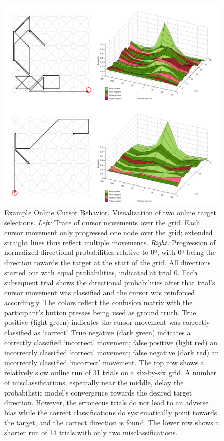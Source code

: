 \begin{figure}[p]
    \renewcommand\thefigure{\ref{chapter:nat}.S9}
    \centering
    \includegraphics[width=\textwidth]{figures/nat-app-fig-s9.png}
    \caption[Example online cursor behavior.]{Example Online Cursor Behavior. Visualization of two online target selections. \textit{Left:} Trace of cursor movements over the grid. Each cursor movement only progressed one node over the grid; extended straight lines thus reflect multiple movements. \textit{Right:} Progression of normalized directional probabilities relative to 0º, with 0º being the direction towards the target at the start of the grid. All directions started out with equal probabilities, indicated at trial 0. Each subsequent trial shows the directional probabilities after that trial's cursor movement was classified and the cursor was reinforced accordingly. The colors reflect the confusion matrix with the participant's button presses being used as ground truth. True positive (light green) indicates the cursor movement was correctly classified as `correct'. True negative (dark green) indicates a correctly classified `incorrect' movement; false positive (light red) an incorrectly classified `correct' movement; false negative (dark red) an incorrectly classified `incorrect' movement. The top row shows a relatively slow online run of 31 trials on a six-by-six grid. A number of misclassifications, especially near the middle, delay the probabilistic model's convergence towards the desired target direction. However, the erroneous trials do not lead to an adverse bias while the correct classifications do systematically point towards the target, and the correct direction is found. The lower row shows a shorter run of 14 trials with only two misclassifications.}
\end{figure}

